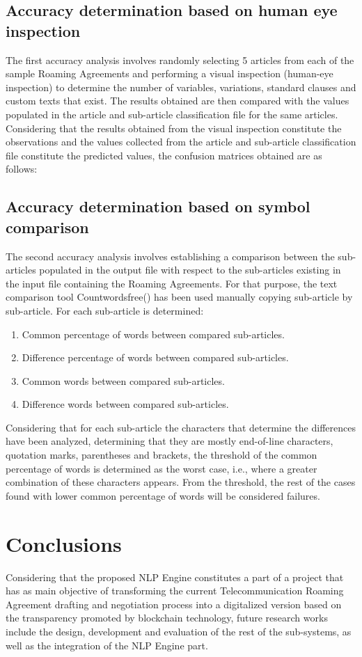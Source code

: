\documentclass[conference]{style/IEEEtran}
\begin{document}
\subsection{Accuracy determination based on human eye inspection}
The first accuracy analysis involves randomly selecting 5 articles from each of the sample Roaming Agreements and performing a visual inspection (human-eye inspection) to determine the number of variables, variations, standard clauses and custom texts that exist. The results obtained are then compared with the values populated in the article and sub-article classification file for the same articles. Considering that the results obtained from the visual inspection constitute the observations and the values collected from the article and sub-article classification file constitute the predicted values, the confusion matrices obtained are as follows:

\subsection{Accuracy determination based on symbol comparison}
The second accuracy analysis involves establishing a comparison between the sub-articles populated in the output file with respect to the sub-articles existing in the input file containing the Roaming Agreements. For that purpose, the text comparison tool Countwordsfree(\cite{countwordsfree}) has been used manually copying sub-article by sub-article. For each sub-article is determined:
 \begin{enumerate}
\item Common percentage of words between compared sub-articles.
\item Difference percentage of words between compared sub-articles.
\item Common words between compared sub-articles.
\item Difference words between compared sub-articles.
\end{enumerate}

Considering that for each sub-article the characters that determine the differences have been analyzed, determining that they are mostly end-of-line characters, quotation marks, parentheses and brackets, the threshold of the common percentage of words is determined as the worst case, i.e., where a greater combination of these characters appears. From the threshold, the rest of the cases found with lower common percentage of words will be considered failures.

\section{Conclusions}
Considering that the proposed NLP Engine constitutes a part of a project that has as main objective of transforming the current Telecommunication Roaming Agreement drafting and negotiation process into a digitalized version based on the transparency promoted by blockchain technology, future research works include the design, development and evaluation of the rest of the sub-systems, as well as the integration of the NLP Engine part. 

\printbibliography

\vspace{12pt}
\end{document}
